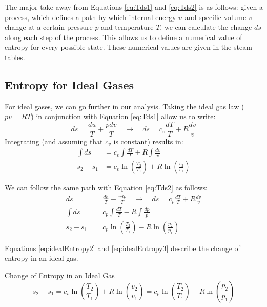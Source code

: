 The major take-away from Equations \ref{eq:Tds1} and \ref{eq:Tds2} is as follows: given a process, which defines a path by which internal energy $u$ and specific volume $v$ change at a certain pressure $p$ and temperature $T$, we can calculate the change $ds$ along each step of the process.  This allows us to define a numerical value of entropy for every possible state.  These numerical values are given in the steam tables.

\subsection{Entropy for Ideal Gases}
For ideal gases, we can go further in our analysis.  Taking the ideal gas law ($pv = RT$) in conjunction with Equation \ref{eq:Tds1} allow us to write:
\begin{equation} \label{eq:idealEntropy1}
  ds  = \frac{du}{T}+ \frac{pdv}{T} \quad\rightarrow\quad ds = c_v \frac{dT}{T} + R\frac{dv}{v}
\end{equation}
Integrating \label{eq:idealEntropy1} (and assuming that $c_v$ is constant) results in:
\begin{align} 
  \nonumber  \int ds &= c_v \int \frac{dT}{T} + R \int \frac{dv}{v} \\
  \label{eq:idealEntropy2} s_2 - s_1 &= c_v \ln \left(\frac{T_2}{T_1}\right) + R \ln \left(\frac{v_2}{v_1}\right)
\end{align}

We can follow the same path with Equation \ref{eq:Tds2} as follows:
\begin{align}
  \nonumber ds  &= \frac{dh}{T}- \frac{vdp}{T} \quad \rightarrow\quad ds = c_p \frac{dT}{T} + R\frac{dv}{v} \\
  \nonumber  \int ds &= c_p \int \frac{dT}{T} - R \int \frac{dp}{p} \\
  \label{eq:idealEntropy3} s_2 - s_1 &= c_p \ln \left(\frac{T_2}{T_1}\right) - R \ln \left(\frac{p_2}{p_1}\right)
\end{align}

Equations \ref{eq:idealEntropy2} and \ref{eq:idealEntropy3} describe the change of entropy in an ideal gas.

\begin{quoteWithTitle}{Change of Entropy in an Ideal Gas}%
  \begin{equation*}
    s_2 - s_1 = c_v \ln \left(\frac{T_2}{T_1}\right) + R \ln \left(\frac{v_2}{v_1}\right) =
    c_p \ln \left(\frac{T_2}{T_1}\right) - R \ln \left(\frac{p_2}{p_1}\right)
  \end{equation*}
\end{quoteWithTitle}

